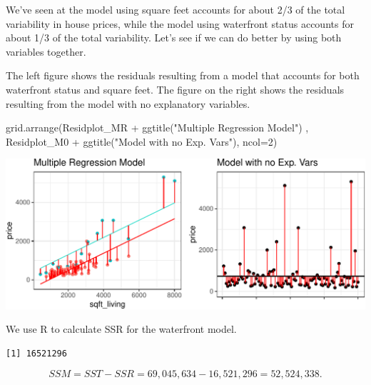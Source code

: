 \documentclass[
  letterpaper,
  DIV=11,
  numbers=noendperiod]{scrreprt}
\newenvironment{Shaded}{\begin{snugshade}}{\end{snugshade}}
\newcommand{\AttributeTok}[1]{\textcolor[rgb]{0.40,0.45,0.13}{#1}}
\newcommand{\DecValTok}[1]{\textcolor[rgb]{0.68,0.00,0.00}{#1}}
\newcommand{\FunctionTok}[1]{\textcolor[rgb]{0.28,0.35,0.67}{#1}}
\newcommand{\NormalTok}[1]{\textcolor[rgb]{0.00,0.23,0.31}{#1}}
\newcommand{\OtherTok}[1]{\textcolor[rgb]{0.00,0.23,0.31}{#1}}
\newcommand{\SpecialCharTok}[1]{\textcolor[rgb]{0.37,0.37,0.37}{#1}}
\newcommand{\StringTok}[1]{\textcolor[rgb]{0.13,0.47,0.30}{#1}}
\begin{document}
We've seen at the model using square feet accounts for about 2/3 of the
total variability in house prices, while the model using waterfront
status accounts for about 1/3 of the total variability. Let's see if we
can do better by using both variables together.

The left figure shows the residuals resulting from a model that accounts
for both waterfront status and square feet. The figure on the right
shows the residuals resulting from the model with no explanatory
variables.

\begin{Shaded}
\begin{Highlighting}[]
\FunctionTok{grid.arrange}\NormalTok{(Residplot\_MR }\SpecialCharTok{+} \FunctionTok{ggtitle}\NormalTok{(}\StringTok{"Multiple Regression Model"}\NormalTok{) , Residplot\_M0 }\SpecialCharTok{+} \FunctionTok{ggtitle}\NormalTok{(}\StringTok{"Model with no Exp. Vars"}\NormalTok{), }\AttributeTok{ncol=}\DecValTok{2}\NormalTok{)}
\end{Highlighting}
\end{Shaded}

\includegraphics{Ch2_files/figure-pdf/unnamed-chunk-38-1.pdf}

We use R to calculate SSR for the waterfront model.

\begin{Shaded}
\end{Shaded}

\begin{verbatim}
[1] 16521296
\end{verbatim}

\[
SSM = SST-SSR = 69,045,634 - 16,521,296 =52,524,338.
\]
\end{document}
